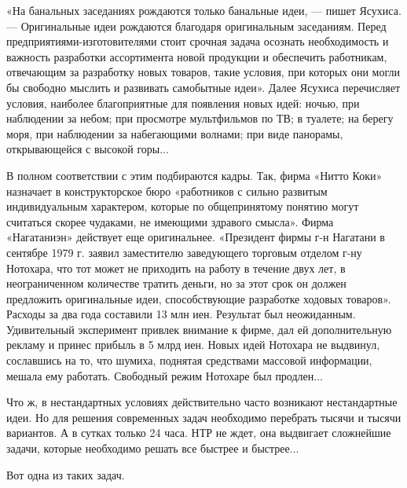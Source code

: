 «На  банальных заседаниях  рождаются  только банальные  идеи, —  пишет
Ясухиса.   —  Оригинальные   идеи  рождаются   благодаря  оригинальным
заседаниям.  Перед предприятиями-изготовителями  стоит срочная  задача
осознать  необходимость  и   важность  разработки  ассортимента  новой
продукции  и обеспечить  работникам,  отвечающим  за разработку  новых
товаров,  такие условия,  при которых  они могли  бы свободно  мыслить
и  развивать  самобытные  идеи». Далее  Ясухиса  перечисляет  условия,
наиболее благоприятные для появления новых идей: ночью, при наблюдении
за  небом; при  просмотре мультфильмов  по  ТВ; в  туалете; на  берегу
моря,  при  наблюдении  за  набегающими волнами;  при  виде  панорамы,
открывающейся с высокой горы...

В  полном соответствии  с этим  подбираются кадры.  Так, фирма  «Нитто
Коки» назначает  в конструкторское бюро «работников  с сильно развитым
индивидуальным  характером,  которые  по общепринятому  понятию  могут
считаться  скорее  чудаками,  не   имеющими  здравого  смысла».  Фирма
«Нагатаниэн» действует еще оригинальнее. «Президент фирмы г-н Нагатани
в  сентябре 1979  г. заявил  заместителю заведующего  торговым отделом
г-ну Нотохара,  что тот может  не приходить  на работу в  течение двух
лет, в  неограниченном количестве тратить  деньги, но за этот  срок он
должен предложить оригинальные идеи, способствующие разработке ходовых
товаров».  Расходы за  два года  составили 13  млн иен.  Результат был
неожиданным. Удивительный  эксперимент привлек  внимание к  фирме, дал
ей  дополнительную  рекламу и  принес  прибыль  в  5 млрд  иен.  Новых
идей  Нотохара не  выдвинул, сославшись  на то,  что шумиха,  поднятая
средствами массовой  информации, мешала ему работать.  Свободный режим
Нотохаре был продлен...

Что  ж,   в  нестандартных  условиях  действительно   часто  возникают
нестандартные  идеи.  Но  для  решения  современных  задач  необходимо
перебрать тысячи и тысячи вариантов. А в сутках только 24 часа. НТР не
ждет, она  выдвигает сложнейшие задачи, которые  необходимо решать все
быстрее и быстрее...

Вот одна из таких задач.

